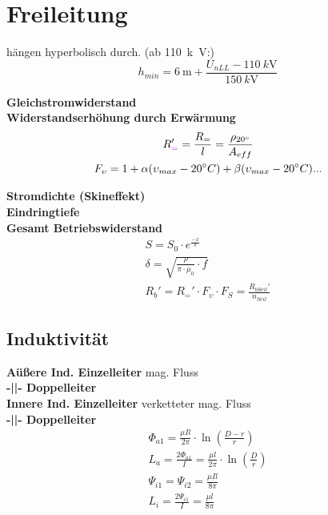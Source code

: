 \section{Freileitung}
hängen hyperbolisch durch. (ab \SI{110}{k\volt}:)
\begin{equation*}
    h_{min} = \SI{6}{\metre} + \frac{U_{nLL} - \SI{110}{k\volt}}{\SI{150}{k\volt}}
\end{equation*}

\textbf{Gleichstromwiderstand}\\
\textbf{Widerstandserhöhung durch Erwärmung}
\begin{gather*}
    R_{\textcolor{purple}{=}}' = \frac{R_{=}}{l} = \frac{\rho_{20 \degree}}{A_{eff}}\\
    F_{\upsilon} = 1 + \alpha (\upsilon_{max} - 20\degree C) + \beta (\upsilon_{max} - 20\degree C)...
\end{gather*}

\textbf{Stromdichte (Skineffekt)}\\
\textbf{Eindringtiefe}\\
\textbf{Gesamt Betriebswiderstand}
\begin{gather*}
    S = S_{0} \cdot e^{\frac{-x}{\delta}}\\
    \delta = \sqrt{ \frac{\rho}{\pi \cdot \mu_{0}} \cdot f}\\
    R_{b}' = R_{=}' \cdot F_{\upsilon} \cdot F_{S} = \frac{R_{b Seil}'}{n_{Seil}}
\end{gather*}

\subsection{Induktivität}
\textbf{Aüßere Ind. Einzelleiter} \textcolor{dgreen}{mag. Fluss}\\
\textbf{-||- Doppelleiter}\\
\textbf{Innere Ind. Einzelleiter} \textcolor{dgreen}{verketteter mag. Fluss}\\
\textbf{-||- Doppelleiter}
\begin{gather*}
    \Phi_{a1} = \frac{\mu I l}{2 \pi} \cdot \ln \left( \frac{D-r}{r}\right)\\
    L_{a} = \frac{2\Phi_{a1}}{I} = \frac{\mu l}{2 \pi} \cdot \ln \left( \frac{D}{r}\right)\\
    \Psi_{i1} = \Psi_{i2} = \frac{\mu I l}{8 \pi}\\
    L_{i} = \frac{2\Psi_{i1}}{I} = \frac{\mu l}{8 \pi}
\end{gather*}


